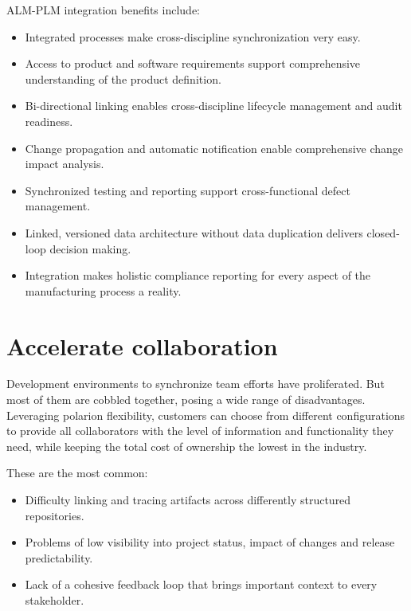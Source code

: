 \documentclass[thesis=M,english]{FITthesis}[2012/06/26]
\begin{document}
ALM-PLM integration benefits include:

\begin{itemize}[nosep]
	\item Integrated processes make cross-discipline synchronization
	very easy.
	\item Access to product and software requirements support
	comprehensive understanding of the product definition.
	\item Bi-directional linking enables cross-discipline lifecycle
	management and audit readiness.
	\item Change propagation and automatic notification enable
	comprehensive change impact analysis.
	\item Synchronized testing and reporting support cross-functional
	defect management.
	\item Linked, versioned data architecture without data duplication
	delivers closed-loop decision making.
	\item Integration makes holistic compliance reporting for every
	aspect of the manufacturing process a reality.
\end{itemize}

\section{Accelerate collaboration}

Development environments to synchronize team efforts have proliferated. But most of them are cobbled together, posing a wide range of disadvantages. Leveraging \acrshort{polarion} flexibility, customers can choose from different configurations to provide all collaborators with the level of information and functionality they need, while keeping the total cost of ownership the lowest in the industry.

These are the most common:
\begin{itemize}[nosep]
	\item Difficulty linking and tracing artifacts across differently
	structured repositories.
	\item Problems of low visibility into project status, impact of
	changes and release predictability.
	\item Lack of a cohesive feedback loop that brings important
	context to every stakeholder.
\end{itemize}
\end{document}
